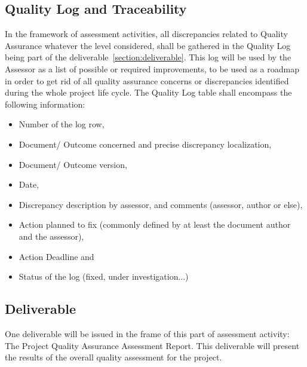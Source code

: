 \documentclass[openetcs]{template/openetcs_article}
\begin{document}
\subsection{Quality Log and Traceability}
In the framework of assessment activities, all discrepancies related to Quality Assurance whatever the level considered, shall be gathered in the Quality Log being part of the deliverable~\ref{section:deliverable}. This log will be used by the Assessor as a list of possible or required improvements, to be used as a roadmap in order to get rid of all quality
assurance concerns or discrepancies identified during the whole project life cycle.
The Quality Log table shall encompass the following information: 
\begin{itemize}
\item Number of the log row,
\item Document/ Outcome concerned and precise discrepancy localization,
\item Document/ Outcome version,
\item Date,
\item Discrepancy description by assessor, and comments (assessor, author or else),
\item Action planned to fix (commonly defined by at least the document author and the assessor),
\item Action Deadline and
\item Status of the log (fixed, under investigation...)
\end{itemize}

\subsection{Deliverable}
One deliverable will be issued in the frame of this part of assessment activity: The Project Quality Assurance Assessment Report. This deliverable will present the results of the overall quality assessment for the project.
\end{document}
